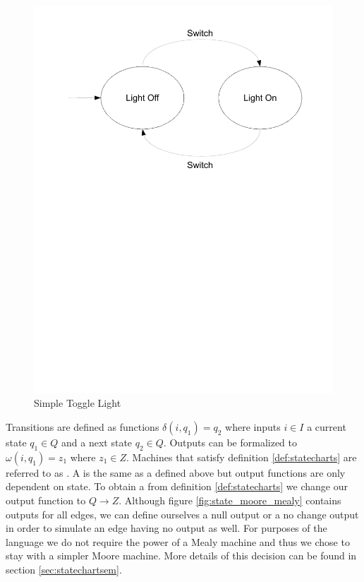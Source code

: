 \begin{figure}[htp]
    \centering
    \includegraphics[trim= 10mm 150mm 10mm 10mm, clip, width=\imgmedium]{./images/state_blink_light.pdf}
    \caption{Simple Toggle Light}
    \label{fig:state_blink_light}
\end{figure}

Transitions are defined as functions $\delta(i,q_1) = q_2$ where inputs $i \in I$ a current state $q_1 \in Q$ and a next state $q_2 \in Q$.  Outputs can be formalized to $\omega(i,q_1)=z_1$ where $z_1 \in Z$. Machines that satisfy definition \ref{def:statecharts} are referred to as  \cite{booth}. A  is the same as a defined above but output functions are only dependent on state. To obtain a  from definition \ref{def:statecharts} we change our output function to $Q \rightarrow Z$. Although figure \ref{fig:state_moore_mealy} contains outputs for all edges, we can define ourselves a null output or a no change output in order to simulate an edge having no output as well. For purposes of the \plccharts language we do not require the power of a Mealy machine and thus we chose to stay with a simpler Moore machine. More details of this decision can be found in section \ref{sec:statechartsem}.

